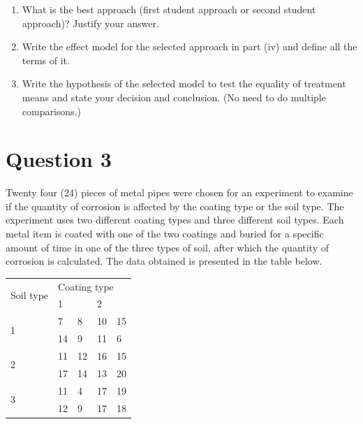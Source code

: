 \documentclass[
  a4paper]{article}
\begin{document}
\begin{enumerate}
\def\labelenumi{\roman{enumi})}
\setcounter{enumi}{3}
\item
  What is the best approach (first student approach or second student
  approach)? Justify your answer.
\item
  Write the effect model for the selected approach in part (iv) and
  define all the terms of it.
\item
  Write the hypothesis of the selected model to test the equality of
  treatment means and state your decision and conclusion. (No need to do
  multiple comparisons.)
\end{enumerate}

\section{Question 3}\label{question-3}

Twenty four (24) pieces of metal pipes were chosen for an experiment to
examine if the quantity of corrosion is affected by the coating type or
the soil type. The experiment uses two different coating types and three
different soil types. Each metal item is coated with one of the two
coatings and buried for a specific amount of time in one of the three
types of soil, after which the quantity of corrosion is calculated. The
data obtained is presented in the table below.

\begin{table}[!h]
\centering
\begin{tabular}{|l|llll|}
\hline
\multirow{2}{*}{Soil type} & \multicolumn{4}{l|}{Coating type}                                                    \\ \cline{2-5} 
                  & \multicolumn{2}{l|}{1}                         & \multicolumn{2}{l|}{2}    \\ \hline
\multirow{2}{*}{1} & \multicolumn{1}{l|}{7} & \multicolumn{1}{l|}{8} & \multicolumn{1}{l|}{10} & 15 \\ \cline{2-5} 
                  & \multicolumn{1}{l|}{14} & \multicolumn{1}{l|}{9} & \multicolumn{1}{l|}{11} & 6 \\ \hline
\multirow{2}{*}{2} & \multicolumn{1}{l|}{11} & \multicolumn{1}{l|}{12} & \multicolumn{1}{l|}{16} & 15 \\ \cline{2-5} 
                  & \multicolumn{1}{l|}{17} & \multicolumn{1}{l|}{14} & \multicolumn{1}{l|}{13} & 20 \\ \hline
\multirow{2}{*}{3} & \multicolumn{1}{l|}{11} & \multicolumn{1}{l|}{4} & \multicolumn{1}{l|}{17} & 19 \\ \cline{2-5} 
                  & \multicolumn{1}{l|}{12} & \multicolumn{1}{l|}{9} & \multicolumn{1}{l|}{17} & 18 \\ \hline
\end{tabular}
\end{table}
\end{document}
